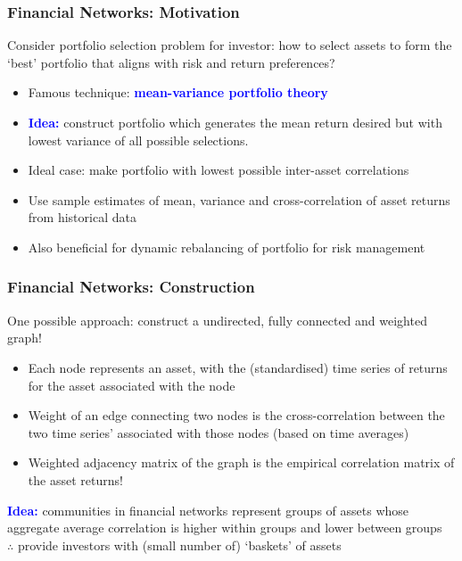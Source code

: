 \documentclass{beamer}
\begin{document}

\begin{frame}
	\frametitle{Financial Networks: Motivation}
	Consider portfolio selection problem for investor: how to select assets to form the `best' portfolio that aligns with risk and return preferences?
	\begin{itemize}
		\vfill\item Famous technique: \textcolor{blue}{\textbf{mean-variance portfolio theory}}
		\vfill\item \textcolor{blue}{\textbf{Idea:}} construct portfolio which generates the mean return desired but with lowest variance of all possible selections.
		\vfill\item Ideal case: make portfolio with lowest possible inter-asset correlations
		\vfill\item Use sample estimates of mean, variance and cross-correlation of asset returns from historical data
		\vfill\item Also beneficial for dynamic rebalancing of portfolio for risk management
	\end{itemize}
\end{frame}


\begin{frame}
	\frametitle{Financial Networks: Construction}
	One possible approach: construct a undirected, fully connected and weighted graph!
	\begin{itemize}
		\vfill\item Each node represents an asset, with the (standardised) time series of returns for the asset associated with the node
		\vfill\item Weight of an edge connecting two nodes is the cross-correlation between the two time series' associated with those nodes (based on time averages)
		\vfill\item Weighted adjacency matrix of the graph is the empirical correlation matrix of the asset returns!
	\end{itemize}
	\textcolor{blue}{\textbf{Idea:}} communities in financial networks represent groups of assets whose aggregate average correlation is higher within groups and lower between groups \\
	$\therefore$ provide investors with (small number of) `baskets' of assets
\end{frame}
\end{document}
